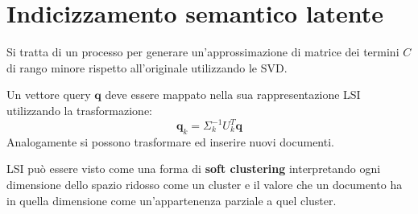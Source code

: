 \documentclass[\main/main.tex]{subfiles}
\begin{document}
\section{Indicizzamento semantico latente}
\begin{multicols}{2}
\begin{definition}
    Si tratta di un processo per generare un'approssimazione di matrice dei termini \(C\) di rango minore rispetto all'originale utilizzando le SVD.
\end{definition}
\begin{observation}
    Un vettore query \(\bm{q}\) deve essere mappato nella sua rappresentazione LSI utilizzando la trasformazione:
    \[
        \bm{q}_{k}=\Sigma_{k}^{-1} U_{k}^{T} \bm{q}
    \]
    Analogamente si possono trasformare ed inserire nuovi documenti.
\end{observation}
\begin{observation}
    LSI può essere visto come una forma di \textbf{soft clustering} interpretando ogni dimensione dello spazio ridosso come un cluster e il valore che un documento ha in quella dimensione come un'appartenenza parziale a quel cluster.
\end{observation}
\end{multicols}
\end{document}
